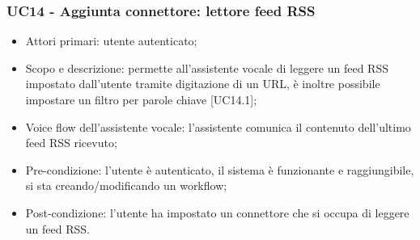 \subsubsection{UC14 - Aggiunta connettore: lettore feed RSS}
\begin{itemize}
	\item  Attori primari: utente autenticato;
	\item  Scopo e descrizione: permette all'assistente vocale di leggere un feed RSS impostato dall'utente tramite digitazione di un URL, è inoltre possibile impostare un filtro per parole chiave [UC14.1];%
	\item  Voice flow dell'assistente vocale: l'assistente comunica il contenuto dell'ultimo feed RSS ricevuto;
	\item  Pre-condizione: l'utente è autenticato, il sistema è funzionante e raggiungibile, si sta creando/modificando un workflow;
	\item  Post-condizione: l'utente ha impostato un connettore che si occupa di leggere un feed RSS.
\end{itemize}
